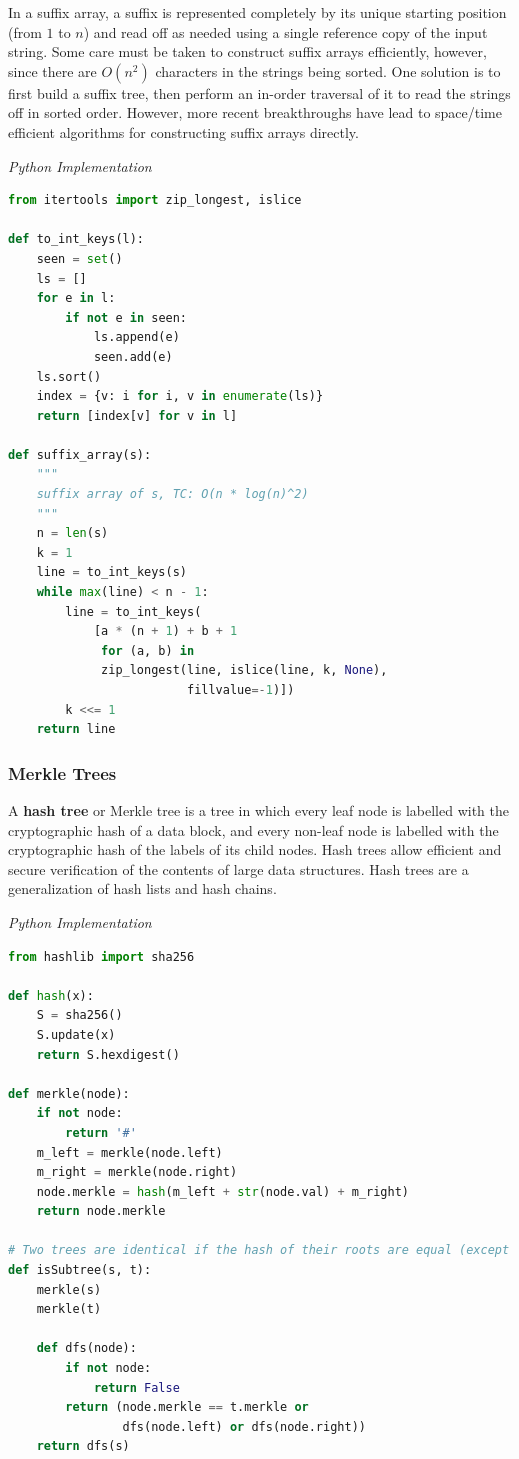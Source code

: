 \documentclass{article}
\begin{document}
    In a suffix array, a suffix is represented completely by its unique starting position (from $1$ to $n$) and read off as needed using a single reference copy of the input string. Some care must be taken to construct suffix arrays efficiently, however, since there are $O(n^2)$ characters in the strings being sorted. One solution is to first build a suffix tree, then perform an in-order traversal of it to read the strings off in sorted order. However, more recent breakthroughs have lead to space/time efficient algorithms for constructing suffix arrays directly.

\vspace{8pt} \emph{Python Implementation}
\begin{lstlisting}[language=Python]
from itertools import zip_longest, islice

def to_int_keys(l):
    seen = set()
    ls = []
    for e in l:
        if not e in seen:
            ls.append(e)
            seen.add(e)
    ls.sort()
    index = {v: i for i, v in enumerate(ls)}
    return [index[v] for v in l]

def suffix_array(s):
    """
    suffix array of s, TC: O(n * log(n)^2)
    """
    n = len(s)
    k = 1
    line = to_int_keys(s)
    while max(line) < n - 1:
        line = to_int_keys(
            [a * (n + 1) + b + 1
             for (a, b) in
             zip_longest(line, islice(line, k, None),
                         fillvalue=-1)])
        k <<= 1
    return line
\end{lstlisting}
    
    \subsubsection{Merkle Trees}
    A \textbf{hash tree} or Merkle tree is a tree in which every leaf node is labelled with the cryptographic hash of a data block, and every non-leaf node is labelled with the cryptographic hash of the labels of its child nodes. Hash trees allow efficient and secure verification of the contents of large data structures. Hash trees are a generalization of hash lists and hash chains.
    
\vspace{8pt} \emph{Python Implementation}
\begin{lstlisting}[language=Python]
from hashlib import sha256

def hash(x):
    S = sha256()
    S.update(x)
    return S.hexdigest()

def merkle(node):
    if not node:
        return '#'
    m_left = merkle(node.left)
    m_right = merkle(node.right)
    node.merkle = hash(m_left + str(node.val) + m_right)
    return node.merkle

# Two trees are identical if the hash of their roots are equal (except for collisions)
def isSubtree(s, t):
    merkle(s)
    merkle(t)
    
    def dfs(node):
        if not node:
            return False
        return (node.merkle == t.merkle or
                dfs(node.left) or dfs(node.right))
    return dfs(s)
\end{lstlisting}
\end{document}
